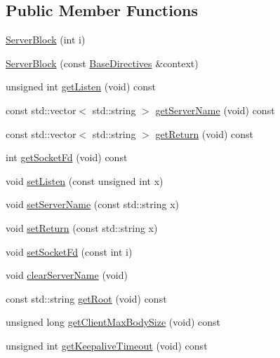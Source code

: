 \subsection*{Public Member Functions}
\begin{DoxyCompactItemize}
\item 
\hyperlink{classft_1_1_server_block_a592b14cd2e97683f3997e666c41e5009}{Server\+Block} (int i)
\item 
\hyperlink{classft_1_1_server_block_ac14b720cf43fb61943107d397f5427f4}{Server\+Block} (const \hyperlink{classft_1_1_base_directives}{Base\+Directives} \&context)
\item 
unsigned int \hyperlink{classft_1_1_server_block_a2e03d2c2635620f103971ff8031779a7}{get\+Listen} (void) const
\item 
const std\+::vector$<$ std\+::string $>$ \hyperlink{classft_1_1_server_block_aa14d06f644ee8148fa9e2ee53d9625f9}{get\+Server\+Name} (void) const
\item 
const std\+::vector$<$ std\+::string $>$ \hyperlink{classft_1_1_server_block_aeef5e4710c02406c46e54d4aa0c8f57c}{get\+Return} (void) const
\item 
int \hyperlink{classft_1_1_server_block_ac1e0cef7ed1f4b52957f006c3fa71b03}{get\+Socket\+Fd} (void) const
\item 
void \hyperlink{classft_1_1_server_block_a6ada7f58bd6d345178035030f68d15d1}{set\+Listen} (const unsigned int x)
\item 
void \hyperlink{classft_1_1_server_block_a89dfb84333debfc1871f28ef625f9556}{set\+Server\+Name} (const std\+::string x)
\item 
void \hyperlink{classft_1_1_server_block_a041d07c701e052b114ef353d5e588998}{set\+Return} (const std\+::string x)
\item 
void \hyperlink{classft_1_1_server_block_aee928b6b4811d6e7bfee9d37796597f6}{set\+Socket\+Fd} (const int i)
\item 
void \hyperlink{classft_1_1_server_block_aaf4aa7d96124b157e91274eb88c77808}{clear\+Server\+Name} (void)
\item 
const std\+::string \hyperlink{classft_1_1_base_directives_aa5dbcb08bda0a0e7e502d2df7cf64287}{get\+Root} (void) const
\item 
unsigned long \hyperlink{classft_1_1_base_directives_a930398ba1e4b99b2ba01a60dcda0c923}{get\+Client\+Max\+Body\+Size} (void) const
\item 
unsigned int \hyperlink{classft_1_1_base_directives_ab8574338758f65325cab5d1c394826c8}{get\+Keepalive\+Timeout} (void) const

\end{DoxyCompactItemize}
